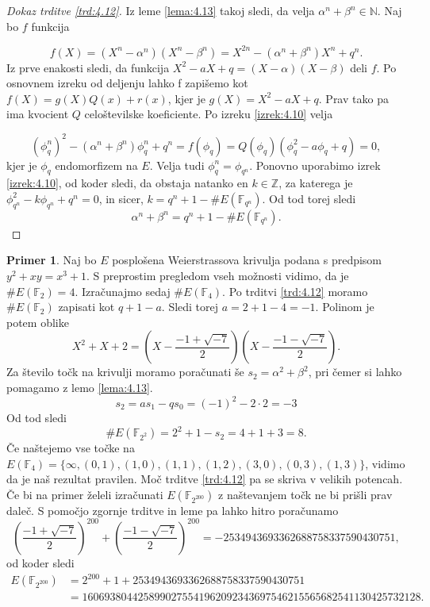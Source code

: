 \documentclass[12pt,a4paper,twoside]{article}
\theoremstyle{definition} %
\newtheorem{primer}[definicija]{Primer}
\theoremstyle{plain} %
\numberwithin{equation}{section}  %
\newcommand{\N}{\mathbb N}
\newcommand{\Z}{\mathbb Z}
\newcommand{\F}{\mathbb F}
\newcommand{\E}[1]{E({#1})}
\begin{document}
\begin{proof}[Dokaz trditve \ref{trd:4.12}]
Iz leme \ref{lema:4.13} takoj sledi, da velja $\alpha^n+\beta^n \in \N$. Naj bo $f$ funkcija

$$f(X) = (X^n-\alpha^n)(X^n-\beta^n) = X^{2n}-(\alpha^n+\beta^n)X^n+q^n.$$
Iz prve enakosti sledi, da funkcija $X^2-aX+q = (X-\alpha)(X-\beta)$ deli $f$. Po osnovnem izreku od deljenju lahko f zapišemo kot $f(X) = g(X)Q(x)+r(x)$, kjer je $g(X)= X^2-aX+q$. Prav tako pa ima kvocient $Q$ celoštevilske koeficiente. Po izreku \ref{izrek:4.10} velja

$$(\phi^n_q)^2 -(\alpha^n+\beta^n)\phi^n_q + q^n = f(\phi_q) = Q(\phi_q)(\phi^2_q-a\phi_q+q) = 0,$$
kjer je $\phi_q$ endomorfizem na $E$. Velja tudi $\phi^n_q = \phi_{q^n}$. Ponovno uporabimo izrek \ref{izrek:4.10}, od koder sledi, da obstaja natanko en $k \in \Z$, za katerega je
$\phi^2_{q^n}-k\phi_{q^n}+q^n=0$, in sicer, $k = q^n+1-\#\E{\F_{q^n}}$. Od tod torej sledi
$$\alpha^n+\beta^n = q^n+1-\#\E{\F_{q^n}}.$$

\end{proof}

\begin{primer}
Naj bo $E$ posplošena Weierstrassova krivulja podana s predpisom $y^2+xy = x^3+1$. S preprostim pregledom vseh možnosti vidimo, da je $\#\E{\F_2} = 4$. Izračunajmo sedaj $\#\E{\F_4}$. Po trditvi \ref{trd:4.12} moramo
$\#\E{\F_2}$ zapisati kot $q+1-a$. Sledi torej $a = 2+1-4 = -1$. Polinom je potem oblike
$$X^2+X+2 = \left( X-\frac{-1+\sqrt{-7}}{2}\right) \left(X-\frac{-1-\sqrt{-7}}{2}\right).$$
Za število točk na krivulji moramo poračunati še $s_2=\alpha^2+\beta^2$, pri čemer si lahko pomagamo z lemo \ref{lema:4.13}.
$$s_2 = as_1-qs_0 = (-1)^2-2\cdot2 = -3$$
Od tod sledi
$$\#\E{\F_{2^2}} = 2^2+1-s_2 = 4+1+3 = 8.$$
 Če naštejemo vse točke na $\E{\F_{4}} = \{ \infty,(0,1),(1,0),(1,1),(1,2),(3,0),(0,3),(1,3)\}$, vidimo da je naš rezultat pravilen.
Moč trditve \ref{trd:4.12} pa se skriva v velikih potencah. Če bi na primer želeli izračunati
$\E{\F_{2^{200}}}$ z naštevanjem točk ne bi prišli prav daleč. S pomočjo zgornje trditve in leme pa lahko hitro poračunamo
$$\left(\frac{-1+\sqrt{-7}}{2}\right)^{200}+ \left(\frac{-1-\sqrt{-7}}{2}\right)^{200} = -2534943693362688758337590430751,$$
od koder sledi
\begin{align}
\E{\F_{2^{200}}} &{}= 2^{200} + 1 +2534943693362688758337590430751 \nonumber \\
&{}= 1606938044258990275541962092343697546215565682541130425732128. \nonumber
\end{align}
\end{primer}
\end{document}
